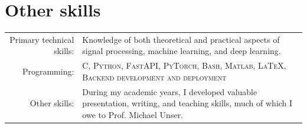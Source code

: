 \documentclass[a4paper,11pt]{article}
\begin{document}

    \vspace{25pt}

    \section{Other skills}

    \begin{tabular}{rp{11cm}}
  	Primary technical skills:  & Knowledge of both theoretical and practical aspects of signal processing, machine learning, and deep learning.
    \vspace{5pt}\\
  	Programming:       &  \textsc{C, Python, FastAPI, PyTorch, Bash, Matlab, \LaTeX, Backend development and deployment}  \vspace{5pt} \\
  	Other skills: 	   & During my academic years, I developed valuable presentation, writing, and teaching skills, much of which I owe to Prof. Michael Unser.

    \end{tabular}


  \newpage

  \begin{bibunit}
    \renewcommand\refname{Publications: Science}

    \nocite{
      aziznejadMeasuringComplexityLearning2023,
      goujonStableParametrizationContinuous2022,
      camposLearningContinuousPiecewiseLinear2022,
      bohraLearningActivationFunctions2020,
      aziznejadDeepNeuralNetworks2020,
      djelouahNeuralInterFrameCompression2019,
      camposContentAdaptiveOptimization2019}

  \end{bibunit}

  \vspace{20pt}

  \begin{bibunit}
    \renewcommand\refname{Publications: Philosophy}

    \nocite{
      camposMahayanaBuddhistEthicsWork-in-Progress,
      camposWrongnessKillingNonHuman2018} %

  \end{bibunit}
\end{document}
